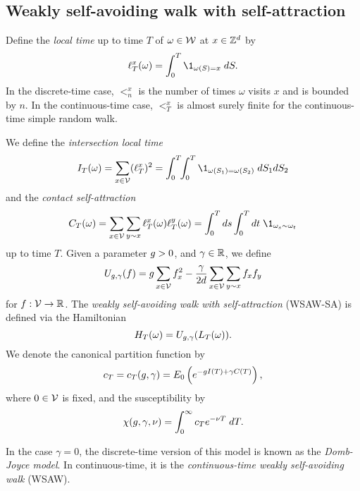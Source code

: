 \subsection{Weakly self-avoiding walk with self-attraction}

Define the \emph{local time} up to time $T$ of $\omega \in \mathcal{W}$ at $x \in { {{\mathbb Z}}^d }$ by
\begin{equation}
\lt^x_T(\omega) = \int_0^T \1_{\omega(S)=x} \; dS.
\end{equation}
In the discrete-time case, $\lt^x_n$ is the number of times $\omega$ visits $x$
and is bounded by $n$. In the continuous-time case, $\lt^x_T$ is almost surely
finite for the continuous-time simple random walk.

We define the \emph{intersection local time}
\begin{equation}
\label{e:ITdef}
I_T(\omega) = \sum_{x\in\vertices} (\lt^x_T)^2
  =
\int_0^T \!\! \int_0^T \1_{\omega(S_1)=\omega(S_2)} \; dS_1 dS_2
\end{equation}
and the \emph{contact self-attraction}
\begin{equation}
\label{e:CTdef}
C_T(\omega) =
  \sum_{x \in \vertices} \sum_{y \sim x} \lt_T^x(\omega) \lt_T^y(\omega)
  = \int_0^T ds \int_0^T dt \; \1_{\omega_{s} \sim \omega_{t}}
\end{equation}
up to time $T$.
Given a parameter $g > 0$,
and $\gamma \in {\mathbb R}$, we define
\begin{equation}
\label{e:Udef-neg}
U_{g,\gamma}(f)
=
g \sum_{x\in\mathcal{V}} f_x^2
- \frac{\gamma}{2d}
\sum_{x\in\mathcal{V}} \sum_{y \sim x} f_x f_y
\end{equation}
for $f : \mathcal{V} \rightarrow {\mathbb R}$.
The \emph{weakly self-avoiding walk with self-attraction} (WSAW-SA) is defined via
the Hamiltonian
\begin{equation}
H_T(\omega) = U_{g,\gamma}(L_T(\omega)).
\end{equation}
We denote the canonical partition function by
\begin{equation}
c_T = c_T(g, \gamma) = E_0 \left( e^{-g I(T) + \gamma C(T)} \right),
\end{equation}
where $0 \in \mathcal{V}$ is fixed, and the susceptibility by
\begin{equation}
\chi(g, \gamma, \nu) = \int_0^\infty c_T e^{-\nu T} \; dT.
\end{equation}

In the case $\gamma = 0$, the discrete-time version of this model is known as
the \emph{Domb-Joyce model}. In continuous-time, it is the \emph{continuous-time
weakly self-avoiding walk} (WSAW).

